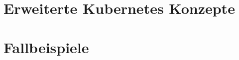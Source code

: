 \documentclass[11pt,a4paper]{article}
\begin{document}
\section{Erweiterte Kubernetes Konzepte}


\section{Fallbeispiele}







\end{document}
